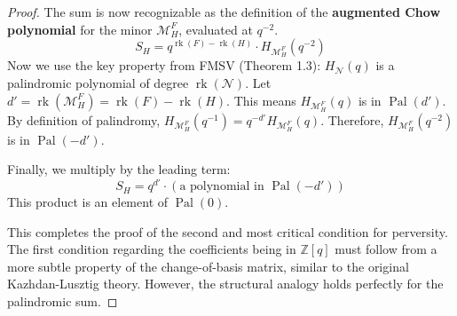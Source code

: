 \documentclass{article}
\theoremstyle{definition}
\newcommand{\matroid}[1]{\mathcal{#1}}
\newcommand{\rank}{\operatorname{rk}}
\newcommand{\Pal}{\operatorname{Pal}}
\newcommand{\AugChowpoly}[1]{H_{#1}}
\begin{document}
\begin{proof}
The sum is now recognizable as the definition of the \textbf{augmented Chow polynomial} for the minor $\matroid{M}_H^F$, evaluated at $q^{-2}$.
\[ S_H = q^{\rank(F)-\rank(H)} \cdot \AugChowpoly{\matroid{M}_H^F}(q^{-2}) \]
Now we use the key property from FMSV (Theorem 1.3): $\AugChowpoly{\matroid{N}}(q)$ is a palindromic polynomial of degree $\rank(\matroid{N})$.
Let $d' = \rank(\matroid{M}_H^F) = \rank(F)-\rank(H)$.
This means $\AugChowpoly{\matroid{M}_H^F}(q)$ is in $\Pal(d')$.
By definition of palindromy, $\AugChowpoly{\matroid{M}_H^F}(q^{-1}) = q^{-d'} \AugChowpoly{\matroid{M}_H^F}(q)$.
Therefore, $\AugChowpoly{\matroid{M}_H^F}(q^{-2})$ is in $\Pal(-d')$.

Finally, we multiply by the leading term:
\[ S_H = q^{d'} \cdot (\text{a polynomial in } \Pal(-d')) \]
This product is an element of $\Pal(0)$.

This completes the proof of the second and most critical condition for perversity. The first condition regarding the coefficients being in $\mathbb{Z}[q]$ must follow from a more subtle property of the change-of-basis matrix, similar to the original Kazhdan-Lusztig theory. However, the structural analogy holds perfectly for the palindromic sum.
\end{proof}
\end{document}
